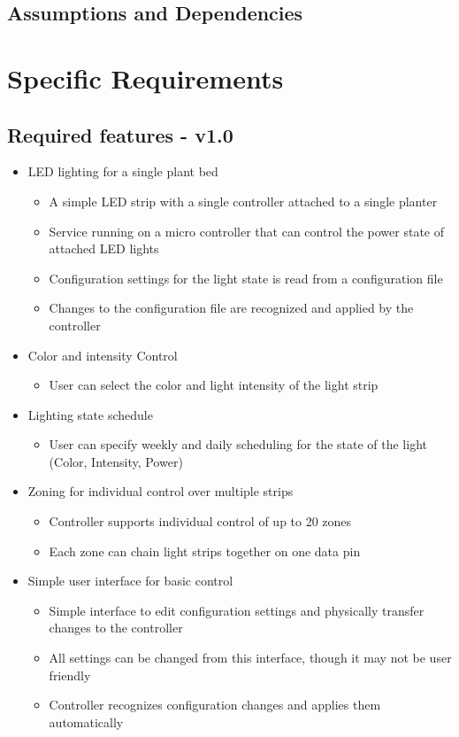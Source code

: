 \documentclass[onecolumn, draftclsnofoot,10pt, compsoc]{IEEEtran}
\begin{document}
		\subsection*{Assumptions and Dependencies}

	\section*{Specific Requirements}

		\subsection*{Required features - v1.0}
		\begin{itemize}
			\item LED lighting for a single plant bed
			\begin{itemize}
				\item A simple LED strip with a single controller attached to a single planter
				\item Service running on a micro controller that can control the power state of attached LED lights
				\item Configuration settings for the light state is read from a configuration file
				\item Changes to the configuration file are recognized and applied by the controller
			\end{itemize}
			\item Color and intensity Control
				\begin{itemize}
					\item User can select the color and light intensity of the light strip
				\end{itemize}
			\item Lighting state schedule
				\begin{itemize}
					\item User can specify weekly and daily scheduling for the state of the light (Color, Intensity, Power)
				\end{itemize}
			\item Zoning for individual control over multiple strips
				\begin{itemize}
					\item Controller supports individual control of up to 20 zones
					\item Each zone can chain light strips together on one data pin
				\end{itemize}
			\item Simple user interface for basic control
				\begin{itemize}
					\item Simple interface to edit configuration settings and physically transfer changes to the controller
					\item All settings can be changed from this interface, though it may not be user friendly
					\item Controller recognizes configuration changes and applies them automatically
				\end{itemize}
		\end{itemize}
\end{document}
